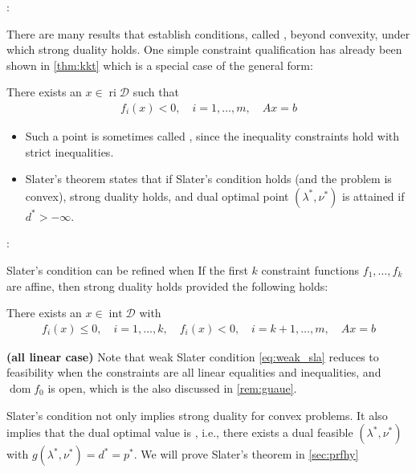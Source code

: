 \documentclass{article}
\newcommand{\bfs}[1]{\textbf{({#1}) }}
\newcommand{\ri}{\operatorname{ri}}
\newcommand{\inte}{\operatorname{int}}
\begin{document}
: 

There are many results that establish conditions, called , beyond convexity, under which strong duality holds. One simple constraint qualification has already been shown in \cref{thm:kkt} which is a special case of the general form:


There exists an $x \in\ri \mathcal{D}$ such that
\begin{align*}
f_{i}(x)<0, \quad i=1, \ldots, m, \quad A x=b
\end{align*}
\begin{itemize}
    \item Such a point is sometimes called , since the inequality constraints hold with strict inequalities. 
    \item  Slater's theorem states that if Slater's condition holds (and the problem is convex), strong duality holds, and dual optimal point $(\lambda^*,\nu^*)$ is attained if $d^*>-\infty$.
\end{itemize}

: 

Slater's condition can be refined when  If the first $k$ constraint functions $f_{1}, \ldots, f_{k}$ are affine, then strong duality holds provided the following  holds: 

There exists an $x \in\inte \mathcal{D}$ with
\begin{align}
f_{i}(x) \leq 0, \quad i=1, \ldots, k, \quad f_{i}(x)<0, \quad i=k+1, \ldots, m, \quad A x=b \label{eq:weak_sla}
\end{align}
\begin{rema}\bfs{all linear case}\label{rem:yre}
Note that weak Slater condition \cref{eq:weak_sla} reduces to feasibility when the constraints are all linear equalities and inequalities, and $\operatorname{dom}f_{0}$ is open, which is the also discussed in \cref{rem:guaue}.
\end{rema}
\begin{rema}
Slater's condition not only implies strong duality for convex problems. It also implies that the dual optimal value is , i.e., there exists a dual feasible $\left(\lambda^* , \nu^* \right)$ with $g\left(\lambda^* , \nu^* \right)=d^* =p^* $. We will prove Slater's theorem in \cref{sec:prfhy}
\end{rema}
\end{document}
